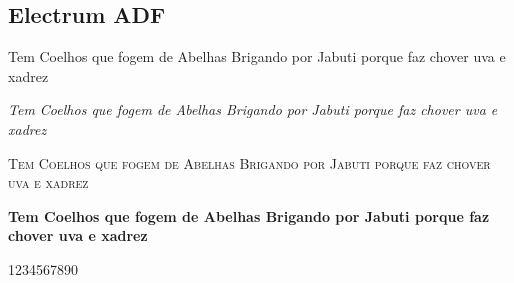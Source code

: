 \documentclass[a4paper]{article}
\newcommand{\frase}{Tem Coelhos que fogem de Abelhas Brigando por Jabuti porque faz chover uva e xadrez}
\begin{document}
\subsection*{Electrum ADF}

\frase

\emph{\frase}

\textsc{\frase}

\textbf{\frase}

1234567890
\end{document}
